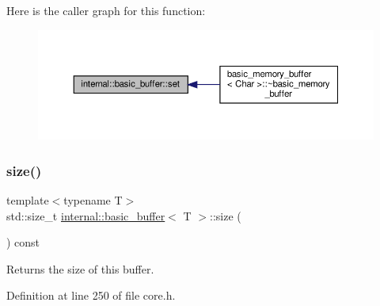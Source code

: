 Here is the caller graph for this function\+:
\nopagebreak
\begin{figure}[H]
\begin{center}
\leavevmode
\includegraphics[width=350pt]{classinternal_1_1basic__buffer_a0b603108f1aa614e64efaac6e081086d_icgraph}
\end{center}
\end{figure}
\mbox{\label{classinternal_1_1basic__buffer_abc95713c3873c5820f10105fe7c7af93}} 
\subsubsection{\texorpdfstring{size()}{size()}}
{\footnotesize\ttfamily template$<$typename T$>$ \\
std\+::size\+\_\+t \hyperlink{classinternal_1_1basic__buffer}{internal\+::basic\+\_\+buffer}$<$ T $>$\+::size (\begin{DoxyParamCaption}{ }\end{DoxyParamCaption}) const\hspace{0.3cm}{\ttfamily [inline]}}

Returns the size of this buffer. 

Definition at line 250 of file core.\+h.


